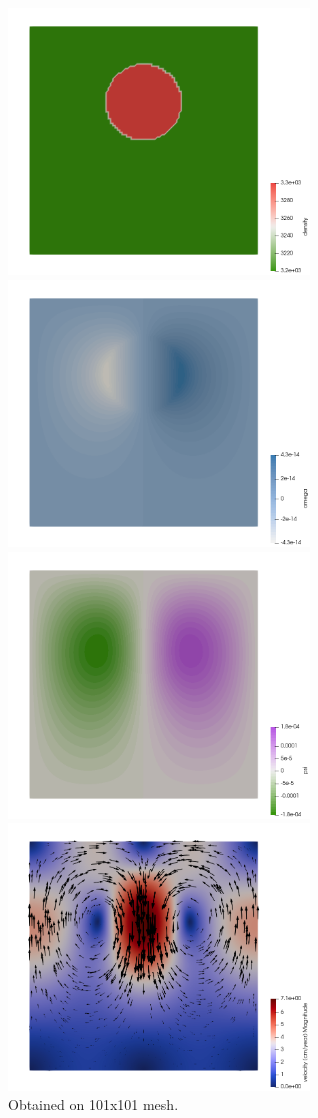 \begin{center}
\includegraphics[width=8cm]{python_codes/fieldstone_153/results/exp1/rho}
\includegraphics[width=8cm]{python_codes/fieldstone_153/results/exp1/omega}\\
\includegraphics[width=8cm]{python_codes/fieldstone_153/results/exp1/psi}
\includegraphics[width=8cm]{python_codes/fieldstone_153/results/exp1/vel}\\
{\captionfont Obtained on 101x101 mesh.} 
\end{center}



